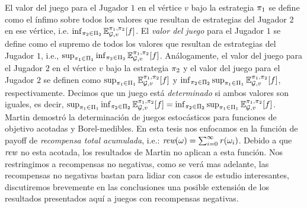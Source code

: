 El valor del juego para el Jugador $1$ en el vértice $v$ bajo la estrategia $\pi_{1}$ se define como el ínfimo sobre todos los valores que resultan de estrategias del Jugador $2$ en ese vértice, i.e. $\inf_{\pi_{2} \in \Pi_{2}} \mathbb{E}^{\pi_{1}, \pi_{2}}_{\mathcal{G},v}[f]$.
El \emph{valor del juego} para el Jugador $1$ se define como el supremo de todos los valores que resultan de estrategias del Jugador $1$, i.e., $\sup_{\pi_{1} \in \Pi_{1}} \inf_{\pi_{2} \in \Pi_{2}} \mathbb{E}^{\pi_{1}, \pi_{2}}_{\mathcal{G},v}[f]$.
Análogamente, el valor del juego para el Jugador $2$ en el vértice $v$ bajo la estrategia $\pi_{2}$ y el valor del juego para el Jugador $2$ se definen como $\sup_{\pi_{1} \in \Pi_{1}}  \mathbb{E}^{\pi_{1}, \pi_{2}}_{\mathcal{G},v}[f]$ 
y $\inf_{\pi_{2} \in \Pi_{2}} \sup_{\pi_{1} \in \Pi_{1}}  \mathbb{E}^{\pi_{1}, \pi_{2}}_{\mathcal{G},v}[f]$, respectivamente. Decimos que un juego está \emph{determinado} si ambos valores son iguales, es decir,
	$\sup_{\pi_{1} \in \Pi_{1}} \inf_{\pi_{2} \in \Pi_{2}} \mathbb{E}^{\pi_{1}, \pi_{2}}_{\mathcal{G},v}[f]
	=
	\inf_{\pi_{2} \in \Pi_{2}} \sup_{\pi_{1} \in \Pi_{1}} \mathbb{E}^{\pi_{1}, \pi_{2}}_{\mathcal{G},v}[f]$.
Martin \cite{Martin98} demostró la determinación de juegos estocásticos para funciones de objetivo acotadas y Borel-medibles.
En esta tesis nos enfocamos en la función de payoff de \emph{recompensa total acumulada}, i.e.: $\textit{rew}(\omega) = \sum^\infty_{i=0} \mathit{r}(\omega_i)$. Debido a que $\textit{rew}$ no esta acotada, los resultados de Martin \cite{Martin98} no aplican a esta función. Nos restringimos a recompensas no negativas, como se verá mas adelante, las recompensas no negativas bastan para lidiar con casos de estudio interesantes, discutiremos brevemente en las conclusiones una posible extensión de los resultados presentados aquí a juegos con recompensas negativas.

	

